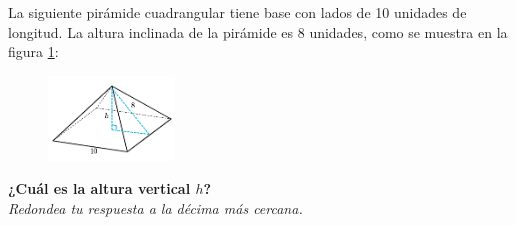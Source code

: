 \question[15]  La siguiente pirámide cuadrangular tiene base con lados de 10 unidades de longitud.
La altura inclinada de la pirámide es 8 unidades, como se muestra en la figura \ref{fig:pitagoras3D_piram_02}:\\
\begin{figure}[H]
    \begin{center}
        \includegraphics[width=0.3\textwidth]{../images/pitagoras3D_piram_02.png}
    \end{center}
    \caption{}
    \label{fig:pitagoras3D_piram_02}
\end{figure}
\textbf{¿Cuál es la altura vertical $h$?}\\
\textit{Redondea tu respuesta a la décima más cercana.}